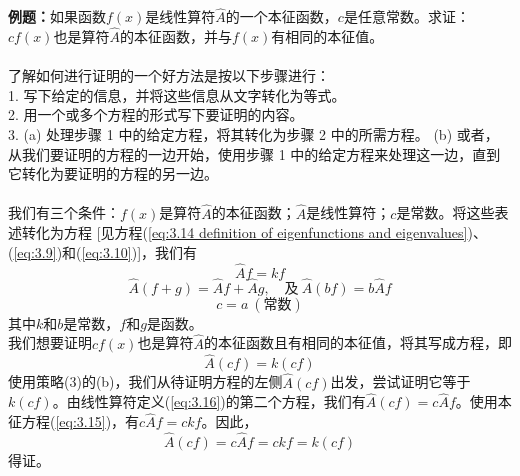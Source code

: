 	\begin{examplebox}
		\textbf{例题：}如果函数$f\left(x\right)$是线性算符$\hat{A}$的一个本征函数，$c$是任意常数。求证：$cf\left(x\right)$也是算符$\hat{A}$的本征函数，并与$f\left(x\right)$有相同的本征值。\\
		\\
		了解如何进行证明的一个好方法是按以下步骤进行：\\
		1. 写下给定的信息，并将这些信息从文字转化为等式。\\
		2. 用一个或多个方程的形式写下要证明的内容。\\
		3. (a) 处理步骤 1 中的给定方程，将其转化为步骤 2 中的所需方程。 (b) 或者，从我们要证明的方程的一边开始，使用步骤 1 中的给定方程来处理这一边，直到它转化为要证明的方程的另一边。\\
		\\
		我们有三个条件：$f\left(x\right)$是算符$\hat{A}$的本征函数；$\hat{A}$是线性算符；$c$是常数。将这些表述转化为方程 [见方程(\ref{eq:3.14 definition of eigenfunctions and eigenvalues})、(\ref{eq:3.9})和(\ref{eq:3.10})]，我们有
		\begin{equation}
			\hat{A} f = kf
			\label{eq:3.15}
		\end{equation}
		\begin{equation}
			\hat{A}\left(f+g\right) = \hat{A}f+\hat{A}g,\quad \text{及}\: \hat{A}\left(bf\right) = b\hat{A}f
			\label{eq:3.16}
		\end{equation}
		\begin{equation*}
			c = a \: \left(\text{常数}\right)
		\end{equation*}
		其中$k$和$b$是常数，$f$和$g$是函数。\\
		我们想要证明$cf\left(x\right)$也是算符$\hat{A}$的本征函数且有相同的本征值，将其写成方程，即
		\begin{equation*}
			\hat{A}\left(cf\right) = k\left(cf\right)
		\end{equation*}
		使用策略(3)的(b)，我们从待证明方程的左侧$\hat{A}\left(cf\right)$出发，尝试证明它等于$k\left(cf\right)$。由线性算符定义(\ref{eq:3.16})的第二个方程，我们有$\hat{A}\left(cf\right) = c\hat{A}f$。使用本征方程(\ref{eq:3.15})，有$c\hat{A}f = ckf$。因此，
		\begin{equation*}
			\hat{A}\left(cf\right) = c\hat{A}f = ckf= k\left(cf\right)
		\end{equation*}
		得证。
	\end{examplebox}
